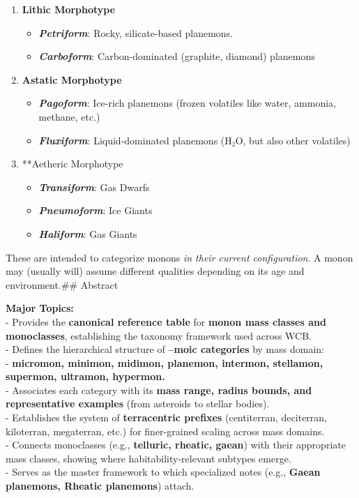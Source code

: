 \documentclass[
  letterpaper,
]{book}
\providecommand{\tightlist}{%
  \setlength{\itemsep}{0pt}\setlength{\parskip}{0pt}}
\begin{document}
\begin{enumerate}
\def\labelenumi{\arabic{enumi}.}
\tightlist
\item
  \textbf{Lithic Morphotype}

  \begin{itemize}
  \tightlist
  \item
    \textbf{\emph{Petriform}}: Rocky, silicate-based planemons.
  \item
    \textbf{\emph{Carboform}}: Carbon-dominated (graphite, diamond)
    planemons
  \end{itemize}
\item
  \textbf{Astatic Morphotype}

  \begin{itemize}
  \tightlist
  \item
    \textbf{\emph{Pagoform}}: Ice-rich planemons (frozen volatiles like
    water, ammonia, methane, etc.)
  \item
    \textbf{\emph{Fluxiform}}: Liquid-dominated planemons (H₂O, but also
    other volatiles)
  \end{itemize}
\item
  **Aetheric Morphotype

  \begin{itemize}
  \tightlist
  \item
    \textbf{\emph{Transiform}}: Gas Dwarfs
  \item
    \textbf{\emph{Pneumoform}}: Ice Giants
  \item
    \textbf{\emph{Haliform}}: Gas Giants
  \end{itemize}
\end{enumerate}

These are intended to categorize monons \emph{in their current
configuration}. A monon may (usually will) assume different qualities
depending on its age and environment.\#\# Abstract

\textbf{Major Topics:}\\
- Provides the \textbf{canonical reference table} for \textbf{monon mass
classes and monoclasses}, establishing the taxonomy framework used
across WCB.\\
- Defines the hierarchical structure of \textbf{--moic categories} by
mass domain:\\
- \textbf{micromon, minimon, midimon, planemon, intermon, stellamon,
supermon, ultramon, hypermon.}\\
- Associates each category with its \textbf{mass range, radius bounds,
and representative examples} (from asteroids to stellar bodies).\\
- Establishes the system of \textbf{terracentric prefixes} (centiterran,
deciterran, kiloterran, megaterran, etc.) for finer-grained scaling
across mass domains.\\
- Connects monoclasses (e.g., \textbf{telluric, rheatic, gaean}) with
their appropriate mass classes, showing where habitability-relevant
subtypes emerge.\\
- Serves as the master framework to which specialized notes (e.g.,
\textbf{Gaean planemons, Rheatic planemons}) attach.
\end{document}
